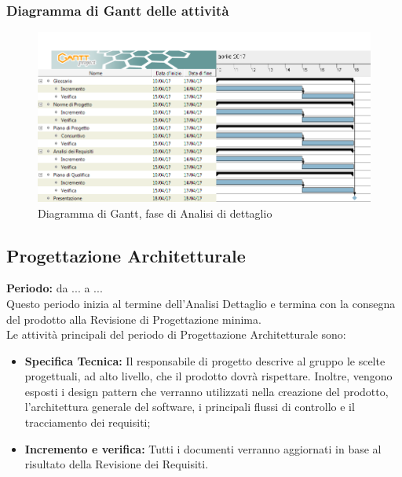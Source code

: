 	\subsubsection{Diagramma di Gantt delle attività}
	\begin{figure}[H]
		\centering
		\includegraphics[width=1\linewidth]{immagini/gantt/consolidamento_requisiti.png}
		\caption{Diagramma di Gantt, fase di Analisi di dettaglio}
	\end{figure}
	\subsection{Progettazione Architetturale}
	\textbf{Periodo:} da ... a ... \\
	Questo periodo inizia al termine dell'Analisi Dettaglio e termina con la consegna del prodotto alla Revisione di Progettazione minima. \\
	Le attività principali del periodo di Progettazione Architetturale sono: \\
	\begin{itemize}
		\item \textbf{Specifica Tecnica:} Il responsabile di progetto descrive al gruppo le scelte progettuali, ad alto livello, che il prodotto dovrà rispettare. Inoltre, vengono esposti i design pattern che verranno utilizzati nella creazione del prodotto, l'architettura generale del software, i principali flussi di controllo e il tracciamento dei requisiti; \\
		\item \textbf{Incremento e verifica:} Tutti i documenti verranno aggiornati in base al risultato
della Revisione dei Requisiti. \\
	\end{itemize}
